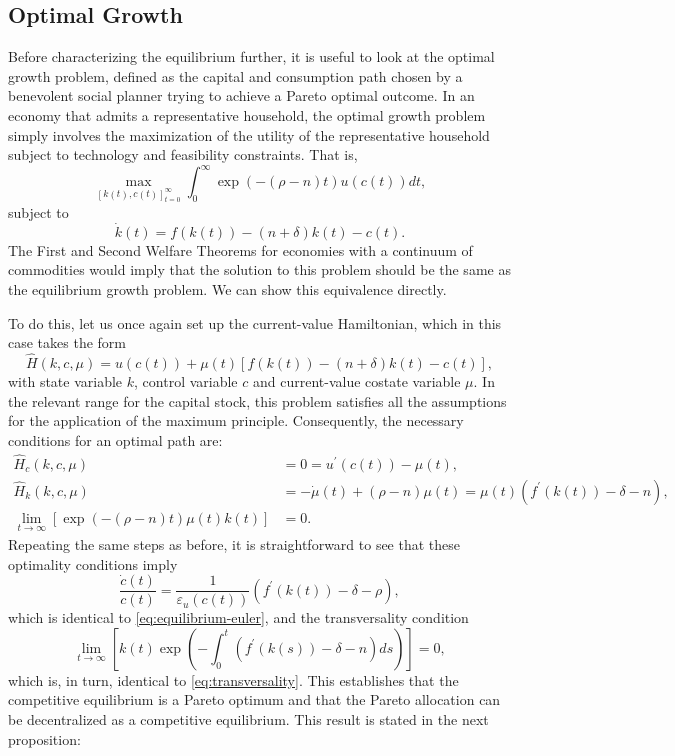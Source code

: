 \documentclass[\topdir/lecture\_notes.tex]{subfiles}
\begin{document}
\subsection{Optimal Growth}
Before characterizing the equilibrium further, it is useful to look at the optimal growth problem, defined as the capital and consumption path chosen by a benevolent social planner trying to achieve a Pareto optimal outcome.
In an economy that admits a representative household, the optimal growth problem simply involves the maximization of the utility of the representative household subject to technology and feasibility constraints.
That is,
\[
  \max _{[k(t), c(t)]_{t=0}^{\infty}} \int_{0}^{\infty} \exp(-(\rho-n) t) u(c(t)) dt,
\]
subject to
\begin{equation}
  \dot{k}(t)=f(k(t))-(n+\delta) k(t)-c(t).
  \label{eq:capital-dynamics}
\end{equation}
The First and Second Welfare Theorems for economies with a continuum of commodities would imply that the solution to this problem should be the same as the equilibrium growth problem.
We can show this equivalence directly.

To do this, let us once again set up the current-value Hamiltonian, which in this case takes the form
\[
  \hat{H}(k, c, \mu)=u(c(t))+\mu(t)[f(k(t))-(n+\delta) k(t)-c(t)],
\]
with state variable \(k\), control variable \(c\) and current-value costate variable \(\mu\).
In the relevant range for the capital stock, this problem satisfies all the assumptions for the application of the maximum principle.
Consequently, the necessary conditions for an optimal path are:
\[
  \begin{aligned}
    \hat{H}_{c}(k, c, \mu)                                      & =0=u^{\prime}(c(t))-\mu(t),                                                  \\
    \hat{H}_{k}(k, c, \mu)                                      & =-\dot{\mu}(t)+(\rho-n) \mu(t)=\mu(t)\left(f^{\prime}(k(t))-\delta-n\right), \\
    \lim _{t \rightarrow \infty}[\exp(-(\rho-n) t) \mu(t) k(t)] & =0.
  \end{aligned}
\]
Repeating the same steps as before, it is straightforward to see that these optimality conditions imply
\[
  \frac{\dot{c}(t)}{c(t)}=\frac{1}{\varepsilon_{u}(c(t))}\left(f^{\prime}(k(t))-\delta-\rho\right),
\]
which is identical to \eqref{eq:equilibrium-euler}, and the transversality condition
\[
  \lim _{t \rightarrow \infty}\left[k(t) \exp \left(-\int_{0}^{t}\left(f^{\prime}(k(s))-\delta-n\right) ds\right)\right]=0,
\]
which is, in turn, identical to \eqref{eq:transversality}.
This establishes that the competitive equilibrium is a Pareto optimum and that the Pareto allocation can be decentralized as a competitive equilibrium.
This result is stated in the next proposition:
\end{document}
